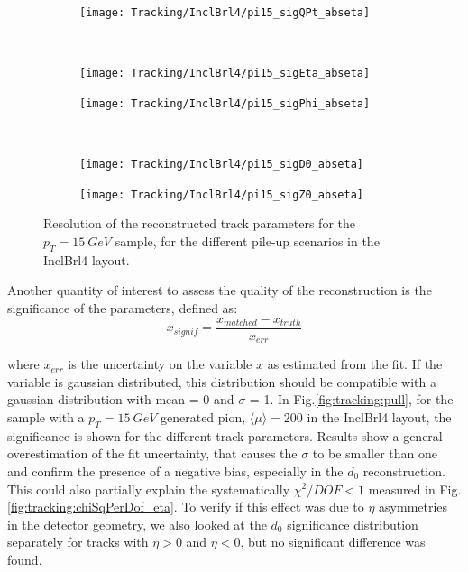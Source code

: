 \documentclass[a4paper,twoside,12pt]{book}
\begin{document}
\begin{figure}
\begin{subfigure}{\linewidth}
\centering
\texttt{[image: Tracking/InclBrl4/pi15\_sigQPt\_abseta]}
\caption{}
\label{fig:tracking:pi15_sigQPt_abseta_InclBrl4}
\end{subfigure}\\[1ex]
\begin{subfigure}{.5\linewidth}
\texttt{[image: Tracking/InclBrl4/pi15\_sigEta\_abseta]}
\caption{}
\label{fig:tracking:pi15_sigEta_abseta_InclBrl4}
\end{subfigure}
\begin{subfigure}{.5\linewidth}
\texttt{[image: Tracking/InclBrl4/pi15\_sigPhi\_abseta]}
\caption{}
\label{fig:tracking:pi15_sigPhi_abseta_InclBrl4}
\end{subfigure}\\[1ex]
\begin{subfigure}{.5\linewidth}
\texttt{[image: Tracking/InclBrl4/pi15\_sigD0\_abseta]}
\caption{}
\label{fig:tracking:pi15_sigD0_abseta_InclBrl4}
\end{subfigure}
\begin{subfigure}{.5\linewidth}
\texttt{[image: Tracking/InclBrl4/pi15\_sigZ0\_abseta]}
\caption{}
\label{fig:tracking:pi15_sigZ0_abseta_InclBrl4}
\end{subfigure}
\caption{Resolution of the reconstructed track parameters for the $p_{T} = 15\ GeV$ sample, for the different pile-up scenarios in the InclBrl4 layout.}
\label{fig:tracking:resolutionPileup_InclBrl4}
\end{figure}

Another quantity of interest to assess the quality of the reconstruction is the significance of the parameters, defined as:
$$
x_{signif} = \frac{x_{matched} - x_{truth}}{x_{err}}
$$

where $x_{err}$ is the uncertainty on the variable $x$ as estimated from the fit. If the variable is gaussian distributed, this distribution should be compatible with
a gaussian distribution with mean = 0 and $\sigma$ = 1. In Fig.\ref{fig:tracking:pull}, for the sample with a $p_{T} = 15\ GeV$ generated pion, $\langle\mu\rangle = 200$ in the InclBrl4 layout, the significance is shown for the different
track parameters. Results show a general overestimation of the fit uncertainty, that causes the $\sigma$ to be smaller than one and confirm the presence of 
a negative bias, especially in the $d_{0}$ reconstruction. This could also partially explain the systematically $\chi^2/DOF < 1$ measured in
Fig.\ref{fig:tracking:chiSqPerDof_eta}. To verify if this effect was due to $\eta$ asymmetries in the detector geometry, 
we also looked at the $d_{0}$ significance distribution separately for tracks with $\eta > 0$ and $\eta < 0$, but no significant difference was found. \\
\end{document}
